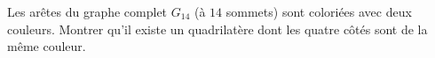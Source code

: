 Les arêtes du graphe complet $G_{14}$ (à $14$ sommets) sont coloriées avec deux couleurs. Montrer qu'il existe un quadrilatère dont les quatre côtés sont de la même couleur.
